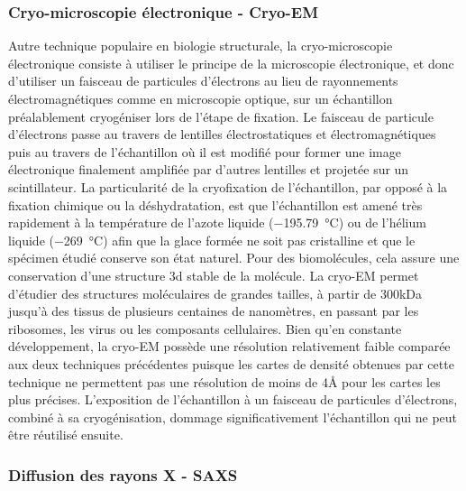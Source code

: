 \subsubsection{Cryo-microscopie électronique - Cryo-EM}

Autre technique populaire en biologie structurale, la cryo-microscopie électronique consiste à utiliser le principe de la microscopie électronique, et donc d'utiliser un faisceau de particules d'électrons au lieu de rayonnements électromagnétiques comme en microscopie optique, sur un échantillon préalablement cryogéniser lors de l'étape de fixation. Le faisceau de particule d'électrons passe au travers de lentilles électrostatiques et électromagnétiques puis au travers de l'échantillon où il est modifié pour former une image électronique finalement amplifiée par d'autres lentilles et projetée sur un scintillateur. 
La particularité de la cryofixation de l'échantillon, par opposé à la fixation chimique ou la déshydratation, est que l'échantillon est amené très rapidement à la température de l'azote liquide (\SI{-195.79}{\degreeCelsius}) ou de l'hélium liquide (\SI{-269}{\degreeCelsius}) afin que la glace formée ne soit pas cristalline et que le spécimen étudié conserve son état naturel. Pour des biomolécules, cela assure une conservation d'une structure 3d stable de la molécule. La cryo-EM permet d'étudier des structures moléculaires de grandes tailles, à partir de 300kDa jusqu'à des tissus de plusieurs centaines de nanomètres, en passant par les ribosomes, les virus ou les composants cellulaires.
Bien qu'en constante développement, la cryo-EM possède une résolution relativement faible comparée aux deux techniques précédentes puisque les cartes de densité obtenues par cette technique ne permettent pas une résolution de moins de 4\r{A} pour les cartes les plus précises\cite{zhou_atomic_2011}. L'exposition de l'échantillon à un faisceau de particules d'électrons, combiné à sa cryogénisation, dommage significativement l'échantillon qui ne peut être réutilisé ensuite.

\subsubsection{Diffusion des rayons X - SAXS}

